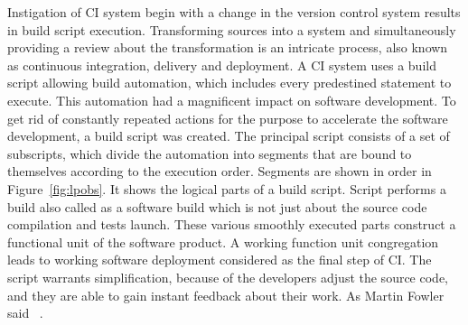 Instigation of CI system begin with a change in the version control system results in build script execution. Transforming sources into a system and simultaneously providing a review about the transformation is an intricate process, also known as continuous integration, delivery and deployment. A CI system uses a build script allowing build automation, which includes every predestined statement to execute. This automation had a magnificent impact on software development. To get rid of constantly repeated actions for the purpose to accelerate the software development, a build script was created. The principal script consists of a set of subscripts, which divide the automation into segments that are bound to themselves according to the execution order. Segments are shown in order in Figure~\ref{fig:lpobs}. It shows the logical parts of a build script. Script performs a build also called as a software build which is not just about the source code compilation and tests launch. These various smoothly executed parts construct a functional unit of the software product. A working function unit congregation leads to working software deployment considered as the final step of CI. The script warrants simplification, because of the developers adjust the source code, and they are able to gain instant feedback about their work. As Martin Fowler said ~\cite{MartinFowler}.

